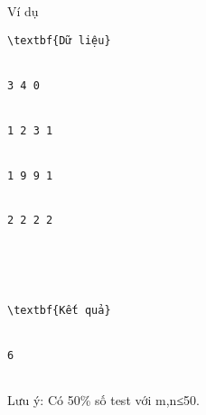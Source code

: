 Ví dụ
\begin{verbatim}
\textbf{Dữ liệu}


3 4 0


1 2 3 1


1 9 9 1


2 2 2 2	





\textbf{Kết quả}


6


\end{verbatim}

   Lưu ý: Có 50\% số test với m,n≤50.